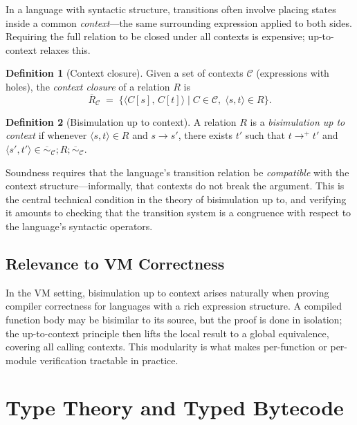 \documentclass[11pt, a4paper]{article}
\theoremstyle{definition}
\newtheorem{definition}{Definition}[section]
\theoremstyle{plain}
\theoremstyle{remark}
\begin{document}
In a language with syntactic structure, transitions often involve placing
states inside a common \emph{context}---the same surrounding expression
applied to both sides. Requiring the full relation to be closed under all
contexts is expensive; up-to-context relaxes this.

\begin{definition}[Context closure]
  Given a set of contexts $\mathcal{C}$ (expressions with holes), the
  \emph{context closure} of a relation $R$ is
  \[
    \overline{R}_{\mathcal{C}} \;=\;
    \{\langle C[s],\, C[t]\rangle \mid C \in \mathcal{C},\; \langle s, t\rangle \in R\}.
  \]
\end{definition}

\begin{definition}[Bisimulation up to context]
  A relation $R$ is a \emph{bisimulation up to context} if whenever
  $\langle s, t\rangle \in R$ and $s \to s'$, there exists $t'$ such that
  $t \to^{+} t'$ and $\langle s', t'\rangle \in \overline{{\sim}}_{\mathcal{C}}
  \mathbin{;} R \mathbin{;} \overline{{\sim}}_{\mathcal{C}}$.
\end{definition}

Soundness requires that the language's transition relation be
\emph{compatible} with the context structure---informally, that contexts
do not break the argument. This is the central technical condition in the
theory of bisimulation up to, and verifying it amounts to checking that the
transition system is a congruence with respect to the language's syntactic
operators.

\subsection{Relevance to VM Correctness}

In the VM setting, bisimulation up to context arises naturally when proving
compiler correctness for languages with a rich expression structure. A
compiled function body may be bisimilar to its source, but the proof is
done in isolation; the up-to-context principle then lifts the local result
to a global equivalence, covering all calling contexts. This modularity is
what makes per-function or per-module verification tractable in practice.


\section{Type Theory and Typed Bytecode}
\label{sec:types}
\end{document}
